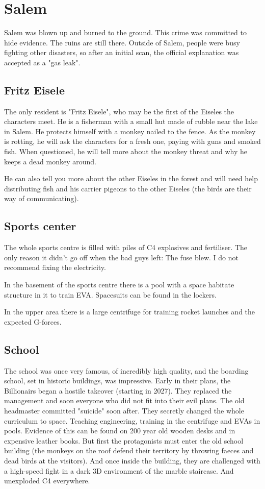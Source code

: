 \section{Salem}

Salem was blown up and burned to the ground. This crime was committed to hide evidence. The ruins are still there. Outside of Salem, people were busy fighting other disasters, so after an initial scan, the official explanation was accepted as a "gas leak".

\subsection{Fritz Eisele}
The only resident is "Fritz Eisele", who may be the first of the Eiseles the characters meet. He is a fisherman with a small hut made of rubble near the lake in Salem.
He protects himself with a monkey nailed to the fence. As the monkey is rotting, he will ask the characters for a fresh one, paying with guns and smoked fish.
When questioned, he will tell more about the monkey threat and why he keeps a dead monkey around.

He can also tell you more about the other Eiseles in the forest and will need help distributing fish and his carrier pigeons to the other Eiseles (the birds are their way of communicating).

\subsection{Sports center}

The whole sports centre is filled with piles of C4 explosives and fertiliser. The only reason it didn't go off when the bad guys left: The fuse blew. I do not recommend fixing the electricity.

In the basement of the sports centre there is a pool with a space habitate structure in it to train EVA. Spacesuits can be found in the lockers.

In the upper area there is a large centrifuge for training rocket launches and the expected G-forces.

\subsection{School}

The school was once very famous, of incredibly high quality, and the boarding school, set in historic buildings, was impressive. Early in their plans, the Billionairs began a hostile takeover (starting in 2027). They replaced the management and soon everyone who did not fit into their evil plans. The old headmaster committed "suicide" soon after.
They secretly changed the whole curriculum to space. Teaching engineering, training in the centrifuge and EVAs in pools.
Evidence of this can be found on 200 year old wooden desks and in expensive leather books.
But first the protagonists must enter the old school building (the monkeys on the roof defend their territory by throwing faeces and dead birds at the visitors). And once inside the building, they are challenged with a high-speed fight in a dark 3D environment of the marble staircase. And unexploded C4 everywhere.

